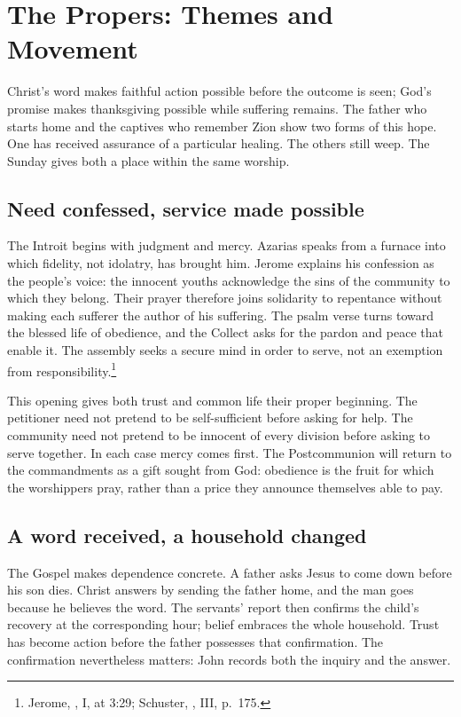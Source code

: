 \section{The Propers: Themes and Movement}
Christ's word makes faithful action possible before the outcome is seen;
God's promise makes thanksgiving possible while suffering remains. The
father who starts home and the captives who remember Zion show two forms
of this hope. One has received assurance of a particular healing. The
others still weep. The Sunday gives both a place within the same worship.

\subsection{Need confessed, service made possible}
The Introit begins with judgment and mercy. Azarias speaks from a furnace
into which fidelity, not idolatry, has brought him. Jerome explains his
confession as the people's voice: the innocent youths acknowledge the
sins of the community to which they belong. Their prayer therefore
joins solidarity to repentance without making each sufferer the author
of his suffering. The psalm verse turns toward the blessed life of
obedience, and the Collect asks for the pardon and peace that enable it.
The assembly seeks a secure mind in order to serve, not an exemption
from responsibility.\footnote{Jerome, , I,
at 3:29; Schuster, , III, p.~175.}

This opening gives both trust and common life their proper beginning.
The petitioner need not pretend to be self-sufficient before asking for
help. The community need not pretend to be innocent of every division
before asking to serve together. In each case mercy comes first. The
Postcommunion will return to the commandments as a gift sought from God:
obedience is the fruit for which the worshippers pray, rather than a
price they announce themselves able to pay.

\subsection{A word received, a household changed}
The Gospel makes dependence concrete. A father asks Jesus to come down
before his son dies. Christ answers by sending the father home, and
the man goes because he believes the word. The servants' report then
confirms the child's recovery at the corresponding hour; belief embraces
the whole household. Trust has become action before the father possesses
that confirmation. The confirmation nevertheless matters: John records
both the inquiry and the answer.

